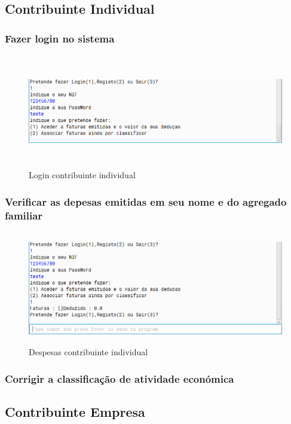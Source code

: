 \documentclass[a4paper]{article}
\begin{document}
	\subsection{Contribuinte Individual}

		\subsubsection{Fazer login no sistema}
			\begin{figure}[H]
				\centering
				\includegraphics[width = 320pt,height = 140pt]{loginci.png}
				\caption{Login contribuinte individual}
			\end{figure}

		\subsubsection{Verificar as depesas emitidas em seu nome e do agregado familiar}
			\begin{figure}[H]
				\centering
				\includegraphics[width = 320pt,height = 140pt]{faturaemitidasci.png}
				\caption{Despesas contribuinte individual}
			\end{figure}

		\subsubsection{Corrigir a classificação de atividade económica}

\pagebreak

	
	\subsection{Contribuinte Empresa}
\end{document}

